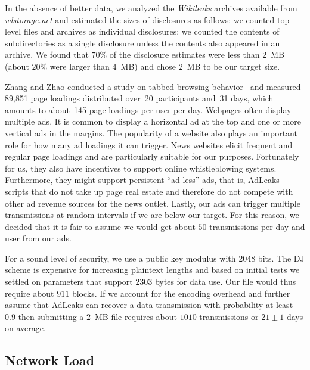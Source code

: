 \documentclass[twocolumn,10pt]{article}
\newcommand{\Kads}{50}
\newcommand{\Kp}{0.9}
\newcommand{\Kfile}{2}
\newcommand{\Ufile}{MB}
\newcommand{\Kmlen}{2303}
\newcommand{\Umlen}{bytes}
\newcommand{\Kcblk}{911}
\newcommand{\Kcnum}{1010}
\newcommand{\Kdays}{21}
\begin{document}
In the absence of better data, we analyzed the \emph{Wikileaks} archives
available from \emph{wlstorage.net} and estimated the sizes of disclosures
as follows: we counted top-level files and archives as individual
disclosures; we counted the contents of subdirectories as a single
disclosure unless the contents also appeared in an archive.  We found that
$70$\% of the disclosure estimates were less than 2~MB (about $20$\% were
larger than $4$~MB) and chose $\Kfile$~\Ufile{} to be our target size.

Zhang and Zhao conducted a study on tabbed browsing
behavior~\cite{ZhangZ2011} and measured 89,851 page loadings distributed
over~20 participants and~31 days, which amounts to about~145 page loadings
per user per day.  Webpages often display multiple ads.  It is common to
display a horizontal ad at the top and one or more vertical ads in the
margins.  The popularity of a website also plays an important role for how
many ad loadings it can trigger.  News websites elicit frequent and regular
page loadings and are particularly suitable for our purposes.  Fortunately
for us, they also have incentives to support online whistleblowing systems.
Furthermore, they might support persistent ``ad-less'' ads, that is, AdLeaks
scripts that do not take up page real estate and therefore do not compete
with other ad revenue sources for the news outlet.  Lastly, our ads can
trigger multiple transmissions at random intervals if we are below our
target.  For this reason, we decided that it is fair to assume we would get
about $\Kads$ transmissions per day and user from our ads.

For a sound level of security, we use a public key modulus with 2048 bits.
The DJ scheme is expensive for increasing plaintext lengths and based on
initial tests we settled on parameters that support $\Kmlen$ \Umlen{} for
data use.  Our file would thus require about $\Kcblk$ blocks.  If we account
for the encoding overhead and further assume that AdLeaks can recover a data
transmission with probability at least $\Kp$ then submitting a
$\Kfile$~\Ufile{} file requires about $\Kcnum$ transmissions or $\Kdays\pm1$
days on average.


\subsection{Network Load}
\end{document}
